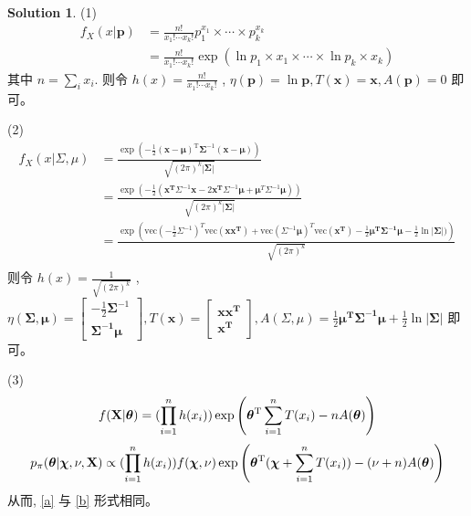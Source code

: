 \documentclass[a4paper,UTF8]{article}
\numberwithin{equation}{section}
\theoremstyle{definition}
\newtheorem*{solution}{Solution}
\begin{document}
\begin{solution} 
(1) %
\begin{equation}
\begin{split}
f_X(x| \mathbf{p} ) &= \frac{n!} {x_1!\cdots x_k!} p_1^{x_1}\times\cdots\times p_k^{x_k}   \\
&= \frac{n!} {x_1!\cdots x_k!} \exp(\ln  p_1 \times {x_1}\times\cdots\times \ln p_k \times {x_k} )
\end{split}
\end{equation}  
其中 $n = \sum_ix_i $. 则令 $h(x) =  \frac{n!} {x_1!\cdots x_k!} $ , $\eta(\mathbf{p}) = \ln \mathbf{p}, T(\mathbf{x}) = \mathbf{x}, A(\mathbf{p}) = 0$ 即可。 


(2)  %
\begin{equation}
\begin{split}
f_X(x | \Sigma, \mu ) &=\frac{\exp\left(-\frac 1 2 ({\mathbf x}-{\boldsymbol\mu})^\mathrm{T}{\boldsymbol\Sigma}^{-1}({\mathbf x}-{\boldsymbol\mu})\right)}{\sqrt{(2\pi)^k|\boldsymbol\Sigma|}}  \\
&= \frac{\exp\left(   { -\frac 1 2 (\mathbf{x^T}\Sigma^{-1}\mathbf{x}  -2\mathbf{x^T}\Sigma^{-1}\boldsymbol\mu + \boldsymbol\mu^T\Sigma^{-1}\boldsymbol\mu   )}     \right)}{\sqrt{(2\pi)^k|\boldsymbol\Sigma|}}  \\
&= \frac{\exp\left(   { \text{vec}(-\frac 1 2 \Sigma^{-1})^T \text{vec} (\mathbf{xx^T})  + \text{vec}(\Sigma^{-1}\boldsymbol\mu)^T\text{vec}(\mathbf{x^T}) -\frac 1 2 \boldsymbol{\mu^T\Sigma^{-1}\mu}   - \frac{1} {2} \ln |\boldsymbol\Sigma|)}     \right)}{\sqrt{(2\pi)^k}}  \\
\end{split}
\end{equation}  
则令 $h(x) =  \frac{1} {\sqrt{(2\pi)^k}}  $ , $\eta(\boldsymbol{\Sigma, \mu}) = \begin{bmatrix} -\frac 1 2 \boldsymbol\Sigma^{-1} \\  \boldsymbol{\Sigma^{-1}\mu} \end{bmatrix}        , T(\mathbf{x}) =\begin{bmatrix}  \mathbf{xx^T} \\  \mathbf{x^T}  \end{bmatrix}  , A(\Sigma, \mu ) = \frac 1 2 \boldsymbol{\mu^T\Sigma^{-1}\mu}   + \frac{1} {2} \ln |\boldsymbol\Sigma| $ 即可。 
\end{solution} 

(3) %
\begin{equation}
\label{a}
f( \mathbf{X} | \boldsymbol\theta) =( \prod_{i=1}^n h(x_i)) \exp \left ( {\boldsymbol\theta}^{\rm T} \sum_{i=1}^nT(x_i) -nA(\boldsymbol\theta)\right)
\end{equation}
\begin{equation}
\label{b}
p_\pi(\boldsymbol\theta|\boldsymbol\chi,\nu, \mathbf{X}) \propto ( \prod_{i=1}^n h(x_i)) f(\boldsymbol\chi,\nu) \exp \left (\boldsymbol\theta^{\rm T} (\boldsymbol\chi + \sum_{i=1}^nT(x_i)) - (\nu+n) A(\boldsymbol\theta) \right )
\end{equation}
从而, \ref{a} 与 \ref{b} 形式相同。
\end{document}
